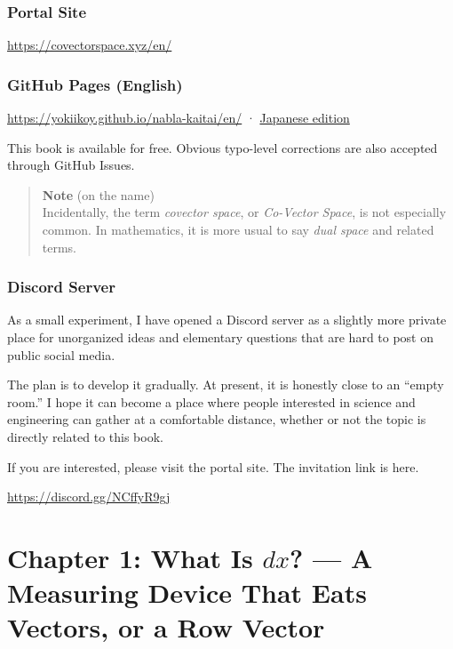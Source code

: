 \documentclass[a4paper,12pt,openany]{book}
\begin{document}
\hypertarget{portal-site}{%
\subsection{Portal Site}\label{portal-site}}

\url{https://covectorspace.xyz/en/}

\hypertarget{github-pages-english}{%
\subsection{GitHub Pages (English)}\label{github-pages-english}}

\url{https://yokiikoy.github.io/nabla-kaitai/en/} ·
\href{https://yokiikoy.github.io/nabla-kaitai/}{Japanese edition}

This book is available for free. Obvious typo-level corrections are also
accepted through GitHub Issues.

\begin{quote}
\textbf{Note} (on the name)\\
Incidentally, the term \emph{covector space}, or \emph{Co-Vector Space},
is not especially common. In mathematics, it is more usual to say
\emph{dual space} and related terms.
\end{quote}

\hypertarget{discord-server}{%
\subsection{Discord Server}\label{discord-server}}

As a small experiment, I have opened a Discord server as a slightly more
private place for unorganized ideas and elementary questions that are
hard to post on public social media.

The plan is to develop it gradually. At present, it is honestly close to
an ``empty room.'' I hope it can become a place where people interested
in science and engineering can gather at a comfortable distance, whether
or not the topic is directly related to this book.

If you are interested, please visit the portal site. The invitation link
is here.

\url{https://discord.gg/NCffyR9gj}

\newpage


\mainmatter
\hypertarget{chapter-1-what-is-dx-a-measuring-device-that-eats-vectors-or-a-row-vector}{%
\chapter{\texorpdfstring{Chapter 1: What Is \(dx\)? — A Measuring
Device That Eats Vectors, or a Row
Vector}{Chapter 1: What Is dx? — A Measuring Device That Eats Vectors, or a Row Vector}}\label{chapter-1-what-is-dx-a-measuring-device-that-eats-vectors-or-a-row-vector}}
\end{document}

